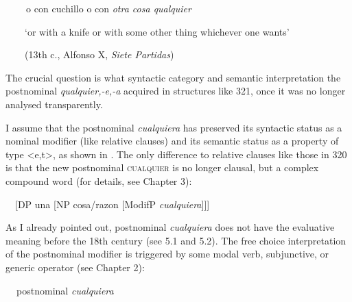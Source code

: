 \begin{styleStandard}
\textbf{\ \ }\ \ o con cuchillo o con \textit{otra cosa qualquier} 
\end{styleStandard}

\begin{styleStandard}
\ \ \ \ ‘or with a knife or with some other thing whichever one wants’ 
\end{styleStandard}

\begin{styleStandard}
\ \ \ \ (13th c., Alfonso X, \textit{Siete Partidas})
\end{styleStandard}

\begin{styleStandard}
The crucial question is what syntactic category and semantic interpretation the postnominal \textit{qualquier,-e,-a} acquired in structures like 321, once it was no longer analysed transparently. 
\end{styleStandard}

\begin{styleStandard}
I assume that the postnominal \textit{cualquiera} has preserved its syntactic status as a nominal modifier (like relative clauses) and its semantic status as a property of type {\textless}e,t{\textgreater}, as shown in . The only difference to relative clauses like those in 320 is that the new postnominal \textsc{cualquier} is no longer clausal, but a complex compound word (for details, see Chapter 3):
\end{styleStandard}

\begin{styleStandard}
\ \ [DP una [NP cosa/razon [ModifP \textit{cualquiera}]]] 
\end{styleStandard}

\begin{styleStandard}
\end{styleStandard}

\begin{styleStandard}
As I already pointed out, postnominal \textit{cualquiera} does not have the evaluative meaning before the 18th century (see 5.1 and 5.2). The free choice interpretation of the postnominal modifier is triggered by some modal verb, subjunctive, or generic operator (see Chapter 2):
\end{styleStandard}

\begin{styleStandard}
\textbf{\ \ }postnominal \textit{cualquiera}
\end{styleStandard}

